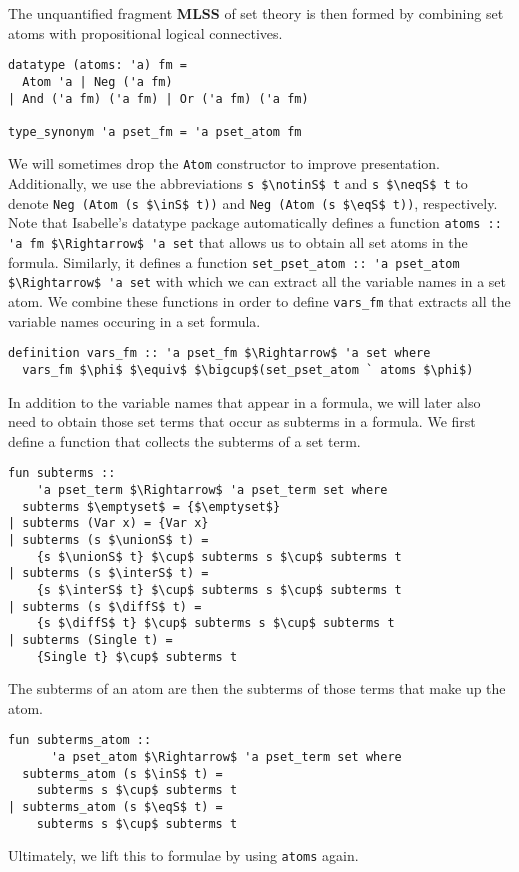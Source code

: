 \documentclass[sigplan,10pt,anonymous,review]{acmart}
\newcommand{\unionS}{\sqcup_\text{s}}
\newcommand{\interS}{\sqcap_\text{s}}
\newcommand{\diffS}{-_\text{s}}
\newcommand{\inS}{\in_\text{s}}
\newcommand{\notinS}{\notin_\text{s}}
\newcommand{\eqS}{\approx_\text{s}}
\newcommand{\neqS}{{\not\approx}_\text{s}}
\begin{document}
The unquantified fragment \textbf{MLSS} of set theory is then formed by combining set atoms with propositional logical connectives.
\begin{lstlisting}
datatype (atoms: 'a) fm =
  Atom 'a | Neg ('a fm)
| And ('a fm) ('a fm) | Or ('a fm) ('a fm)

type_synonym 'a pset_fm = 'a pset_atom fm
\end{lstlisting}
We will sometimes drop the \lstinline!Atom! constructor to improve presentation.
Additionally, we use the abbreviations \lstinline!s $\notinS$ t! and \lstinline!s $\neqS$ t! to denote \lstinline!Neg (Atom (s $\inS$ t))! and \lstinline!Neg (Atom (s $\eqS$ t))!, respectively.
Note that Isabelle's datatype package automatically defines a function \lstinline!atoms :: 'a fm $\Rightarrow$ 'a set! that allows us to obtain all set atoms in the formula.
Similarly, it defines a function \lstinline!set_pset_atom :: 'a pset_atom $\Rightarrow$ 'a set! with which we can extract all the variable names in a set atom.
We combine these functions in order to define \lstinline!vars_fm! that extracts all the variable names occuring in a set formula.
\begin{lstlisting}
definition vars_fm :: 'a pset_fm $\Rightarrow$ 'a set where
  vars_fm $\phi$ $\equiv$ $\bigcup$(set_pset_atom ` atoms $\phi$)
\end{lstlisting}
In addition to the variable names that appear in a formula, we will later also need to obtain those set terms that occur as subterms in a formula. 
We first define a function that collects the subterms of a set term.
\begin{lstlisting}
fun subterms ::
    'a pset_term $\Rightarrow$ 'a pset_term set where
  subterms $\emptyset$ = {$\emptyset$}
| subterms (Var x) = {Var x}
| subterms (s $\unionS$ t) =
    {s $\unionS$ t} $\cup$ subterms s $\cup$ subterms t
| subterms (s $\interS$ t) =
    {s $\interS$ t} $\cup$ subterms s $\cup$ subterms t
| subterms (s $\diffS$ t) =
    {s $\diffS$ t} $\cup$ subterms s $\cup$ subterms t
| subterms (Single t) =
    {Single t} $\cup$ subterms t
\end{lstlisting}
The subterms of an atom are then the subterms of those terms that make up the atom.
\begin{lstlisting}
fun subterms_atom ::
      'a pset_atom $\Rightarrow$ 'a pset_term set where
  subterms_atom (s $\inS$ t) =
    subterms s $\cup$ subterms t
| subterms_atom (s $\eqS$ t) =
    subterms s $\cup$ subterms t
\end{lstlisting}
Ultimately, we lift this to formulae by using \lstinline!atoms! again.
\end{document}
